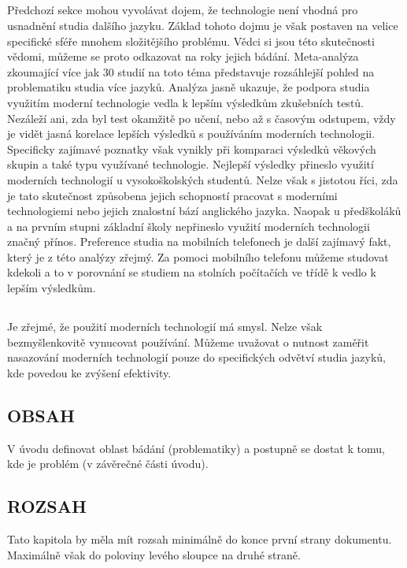 \documentclass[journal]{IEEEtran}
\begin{document}
\subsection{}
Předchozí sekce mohou vyvolávat dojem, že technologie není vhodná pro usnadnění studia dalšího jazyku. Základ tohoto dojmu je však postaven na velice specifické sféře mnohem složitějšího problému. Vědci si jsou této skutečnosti vědomi, můžeme se proto odkazovat na roky jejich bádání.
Meta-analýza zkoumající více jak 30 studií na toto téma představuje rozsáhlejší pohled na problematiku studia více jazyků\cite{technology_vocab}. Analýza jasně ukazuje, že podpora studia využitím moderní technologie vedla k lepším výsledkům zkušebních testů. Nezáleží ani, zda byl test okamžitě po učení, nebo až s časovým odstupem, vždy je vidět jasná korelace lepších výsledků s používáním moderních technologii. Specificky zajímavé poznatky však vynikly při komparaci výsledků věkových skupin a také typu využívané technologie. Nejlepší výsledky přineslo využití moderních technologií u vysokoškolských studentů.
Nelze však s jistotou říci, zda je tato skutečnost způsobena jejich schopností pracovat s moderními technologiemi nebo jejich znalostní bází anglického jazyka.
Naopak u předškoláků a na prvním stupni základní školy nepřineslo využití moderních technologii značný přínos.
Preference studia na mobilních telefonech je další zajímavý fakt, který je z této analýzy zřejmý.
Za pomoci mobilního telefonu můžeme studovat kdekoli a to v porovnání se studiem na stolních počítačích ve třídě k vedlo k lepším výsledkům.

\subsection{}
Je zřejmé, že použití moderních technologií má smysl.
Nelze však bezmyšlenkovitě vynucovat používání.
Můžeme uvažovat o nutnost zaměřit nasazování moderních technologií pouze do specifických odvětví studia jazyků, kde povedou ke zvýšení efektivity.



\subsection{OBSAH}
V úvodu definovat oblast bádání (problematiky) a postupně se dostat k tomu, kde je problém (v závěrečné části úvodu).
\subsection{ROZSAH}
Tato kapitola by měla mít rozsah minimálně do konce první strany dokumentu. Maximálně však do poloviny levého sloupce na druhé straně.
\end{document}
